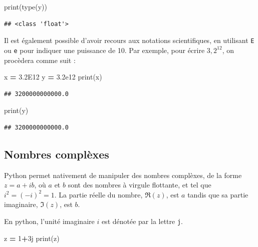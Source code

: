\documentclass[12pt,]{book}
\newenvironment{Shaded}{\begin{snugshade}}{\end{snugshade}}
\newcommand{\DecValTok}[1]{\textcolor[rgb]{0.00,0.00,0.81}{#1}}
\newcommand{\FloatTok}[1]{\textcolor[rgb]{0.00,0.00,0.81}{#1}}
\newcommand{\OperatorTok}[1]{\textcolor[rgb]{0.81,0.36,0.00}{\textbf{#1}}}
\newcommand{\BuiltInTok}[1]{#1}
\newcommand{\NormalTok}[1]{#1}
\numberwithin{equation}{section}
\numberwithin{countremarque}{section}
\begin{document}
\begin{Shaded}
\begin{Highlighting}[]
\BuiltInTok{print}\NormalTok{(}\BuiltInTok{type}\NormalTok{(y))}
\end{Highlighting}
\end{Shaded}

\begin{lstlisting}
## <class 'float'>
\end{lstlisting}

Il est également possible d'avoir recours aux notations scientifiques,
en utilisant \texttt{E} ou \texttt{e} pour indiquer une puissance de 10.
Par exemple, pour écrire \(3,2^12\), on procèdera comme suit :

\begin{Shaded}
\begin{Highlighting}[]
\NormalTok{x }\OperatorTok{=} \FloatTok{3.2E12}
\NormalTok{y }\OperatorTok{=} \FloatTok{3.2e12}
\BuiltInTok{print}\NormalTok{(x)}
\end{Highlighting}
\end{Shaded}

\begin{lstlisting}
## 3200000000000.0
\end{lstlisting}

\begin{Shaded}
\begin{Highlighting}[]
\BuiltInTok{print}\NormalTok{(y)}
\end{Highlighting}
\end{Shaded}

\begin{lstlisting}
## 3200000000000.0
\end{lstlisting}

\subsection{Nombres complèxes}\label{nombres-complexes}

Python permet nativement de manipuler des nombres complèxes, de la forme
\(z=a+ib\), où \(a\) et \(b\) sont des nombres à virgule flottante, et
tel que \(i^2=(-i)^2=1\). La partie réelle du nombre,
\(\mathfrak{R}(z)\), est \(a\) tandis que sa partie imaginaire,
\(\mathfrak{I}(z)\), est \(b\).

En python, l'unité imaginaire \(i\) est dénotée par la lettre
\texttt{j}.

\begin{Shaded}
\begin{Highlighting}[]
\NormalTok{z }\OperatorTok{=} \DecValTok{1}\OperatorTok{+}\NormalTok{3j}
\BuiltInTok{print}\NormalTok{(z)}
\end{Highlighting}
\end{Shaded}
\end{document}
